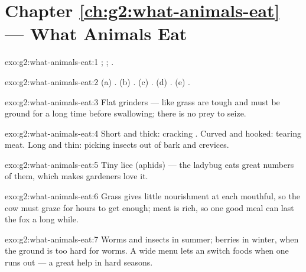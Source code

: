 \section*{Chapter \ref{ch:g2:what-animals-eat} --- What Animals Eat}

\begin{solution}{exo:g2:what-animals-eat:1}
; ; .
\end{solution}

\begin{solution}{exo:g2:what-animals-eat:2}
(a) . (b) . (c) . (d) . (e)
.
\end{solution}

\begin{solution}{exo:g2:what-animals-eat:3}
Flat grinders ---  like grass are tough and must be ground
for a long time before swallowing; there is no prey to seize.
\end{solution}

\begin{solution}{exo:g2:what-animals-eat:4}
Short and thick: cracking . Curved and hooked: tearing meat.
Long and thin: picking insects out of bark and crevices.
\end{solution}

\begin{solution}{exo:g2:what-animals-eat:5}
Tiny  lice (aphids) --- the ladybug eats great numbers of
them, which makes gardeners love it.
\end{solution}

\begin{solution}{exo:g2:what-animals-eat:6}
Grass gives little nourishment at each mouthful, so the cow must
graze for hours to get enough; meat is rich, so one good meal can
last the fox a long while.
\end{solution}

\begin{solution}{exo:g2:what-animals-eat:7}
Worms and insects in summer; berries in winter, when the ground
is too hard for worms. A wide menu lets an  switch foods
when one runs out --- a great help in hard seasons.
\end{solution}

